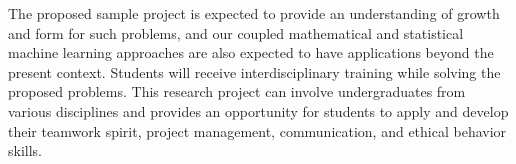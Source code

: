 

The proposed sample project is expected to provide an understanding of growth and form for such problems, and our coupled mathematical and statistical machine learning approaches are also expected to have applications beyond the present context.  Students will receive interdisciplinary training while solving the proposed problems. This research project can involve undergraduates from various disciplines and provides an opportunity for students to apply and develop their teamwork spirit, project management, communication, and ethical behavior skills.
